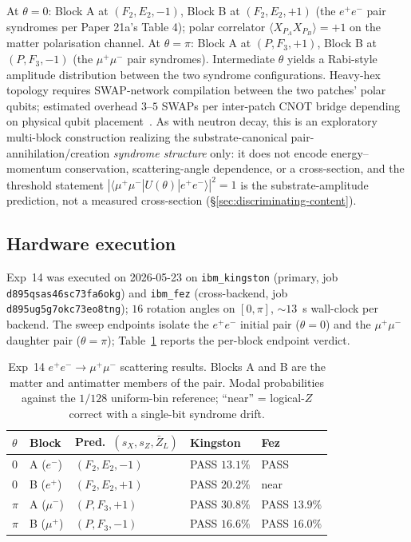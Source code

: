 \documentclass[11pt]{article}
\newcommand{\barZ}{\bar Z_L}
\begin{document}
At $\theta = 0$: Block A at $(F_2, E_2, -1)$, Block B at $(F_2, E_2, +1)$ (the $e^+ e^-$ pair syndromes per Paper 21a's Table 4); polar correlator $\langle X_{P_A} X_{P_B} \rangle = +1$ on the matter polarisation channel.  At $\theta = \pi$: Block A at $(P, F_3, +1)$, Block B at $(P, F_3, -1)$ (the $\mu^+ \mu^-$ pair syndromes).  Intermediate $\theta$ yields a Rabi-style amplitude distribution between the two syndrome configurations.  Heavy-hex topology requires SWAP-network compilation between the two patches' polar qubits; estimated overhead $3$--$5$ SWAPs per inter-patch CNOT bridge depending on physical qubit placement~\cite{BosonMemo}.  As with neutron decay, this is an exploratory multi-block construction realizing the substrate-canonical pair-annihilation/creation \emph{syndrome structure} only: it does not encode energy--momentum conservation, scattering-angle dependence, or a cross-section, and the threshold statement $|\langle \mu^+ \mu^- | U(\theta) | e^+ e^- \rangle|^2 = 1$ is the substrate-amplitude prediction, not a measured cross-section (\S\ref{sec:discriminating-content}).

\subsection{Hardware execution}
\label{sec:emumu-execution}

Exp~14 was executed on 2026-05-23 on \texttt{ibm\_kingston} (primary, job \texttt{d895qsas46sc73fa6okg}) and \texttt{ibm\_fez} (cross-backend, job \texttt{d895ug5g7okc73eo8tng}); $16$ rotation angles on $[0, \pi]$, $\sim 13$~s wall-clock per backend.  The sweep endpoints isolate the $e^+ e^-$ initial pair ($\theta = 0$) and the $\mu^+ \mu^-$ daughter pair ($\theta = \pi$); Table~\ref{tab:exp14-results} reports the per-block endpoint verdict.

\begin{table}[H]
\centering
\caption{Exp~14 $e^+ e^- \to \mu^+ \mu^-$ scattering results.  Blocks A and B are the matter and antimatter members of the pair.  Modal probabilities against the $1/128$ uniform-bin reference; ``near'' = logical-$Z$ correct with a single-bit syndrome drift.}
\label{tab:exp14-results}
\small
\begin{tabular}{lllll}
\toprule
$\theta$ & Block & Pred.\ $(s_X, s_Z, \barZ)$ & Kingston & Fez \\
\midrule
$0$   & A ($e^-$)   & $(F_2, E_2, -1)$ & PASS $13.1\%$ & PASS \\
$0$   & B ($e^+$)   & $(F_2, E_2, +1)$ & PASS $20.2\%$ & near \\
$\pi$ & A ($\mu^-$) & $(P, F_3, +1)$   & PASS $30.8\%$ & PASS $13.9\%$ \\
$\pi$ & B ($\mu^+$) & $(P, F_3, -1)$   & PASS $16.6\%$ & PASS $16.0\%$ \\
\bottomrule
\end{tabular}
\end{table}
\end{document}
